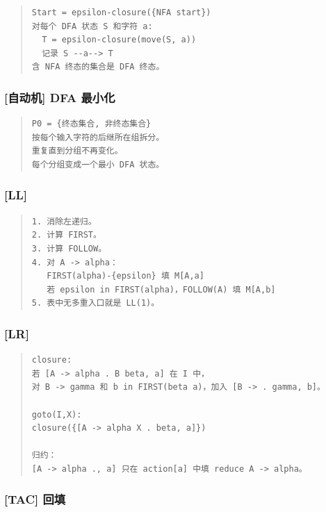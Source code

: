 \documentclass[UTF8,zihao=-4]{ctexart}
\begin{document}
\begin{quote}
\footnotesize
\begin{verbatim}
Start = epsilon-closure({NFA start})
对每个 DFA 状态 S 和字符 a:
  T = epsilon-closure(move(S, a))
  记录 S --a--> T
含 NFA 终态的集合是 DFA 终态。
\end{verbatim}
\end{quote}


\subsubsection{[自动机] DFA 最小化}


\begin{quote}
\footnotesize
\begin{verbatim}
P0 = {终态集合, 非终态集合}
按每个输入字符的后继所在组拆分。
重复直到分组不再变化。
每个分组变成一个最小 DFA 状态。
\end{verbatim}
\end{quote}


\subsubsection{[LL]}


\begin{quote}
\footnotesize
\begin{verbatim}
1. 消除左递归。
2. 计算 FIRST。
3. 计算 FOLLOW。
4. 对 A -> alpha：
   FIRST(alpha)-{epsilon} 填 M[A,a]
   若 epsilon in FIRST(alpha)，FOLLOW(A) 填 M[A,b]
5. 表中无多重入口就是 LL(1)。
\end{verbatim}
\end{quote}


\subsubsection{[LR]}


\begin{quote}
\footnotesize
\begin{verbatim}
closure:
若 [A -> alpha . B beta, a] 在 I 中，
对 B -> gamma 和 b in FIRST(beta a)，加入 [B -> . gamma, b]。

goto(I,X):
closure({[A -> alpha X . beta, a]})

归约：
[A -> alpha ., a] 只在 action[a] 中填 reduce A -> alpha。
\end{verbatim}
\end{quote}


\subsubsection{[TAC] 回填}
\end{document}
